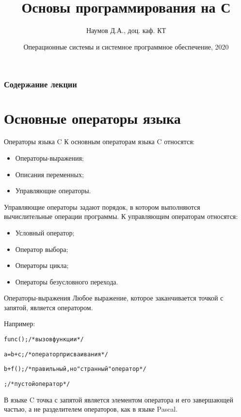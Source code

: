 \documentclass[xcolor=table]{beamer}
\title[Язык C]{Основы программирования на С}
\author{Наумов Д.А., доц. каф. КТ}
\date[10.09.2020] {Операционные системы и системное программное обеспечение, 2020}
\begin{document}
\begin{frame}
  \titlepage
\end{frame}
  
\begin{frame}
  \frametitle{Содержание лекции}
  \tableofcontents  
\end{frame}

\section{Основные операторы языка}

\begin{frame}{Операторы языка C}
К основным операторам языка C относятся: 
\begin{itemize}
\item Операторы-выражения;
\item Описания переменных;
\item Управляющие операторы.
\end{itemize}

Управляющие операторы задают порядок, в котором выполняются вычислительные операции программы. К управляющим операторам относятся:
\begin{itemize}
\item Условный оператор;
\item Оператор выбора;
\item Операторы цикла;
\item Операторы безусловного перехода.
\end{itemize}
\end{frame} 

\begin{frame}{Операторы-выражения}
Любое выражение, которое заканчивается точкой с запятой, является оператором.

Например:
\begin{alltt}
    func();    /* вызов функции */ 
    
    a = b + c; /* оператор присваивания */
    
    b + f();   /* правильный, но "странный" оператор */
    
     ;         /* пустой оператор */
\end{alltt}
В языке C точка с запятой является элементом оператора и его завершающей частью, а не разделителем операторов, как в языке Pascal.
\end{frame}
\end{document}
